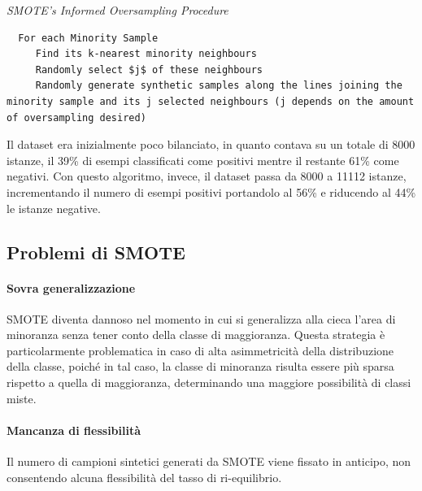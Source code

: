 \lstset{style=customAlg}
\begin{algorithm}
	\caption{\emph{SMOTE’s Informed Oversampling Procedure}}
	\begin{lstlisting}
  For each Minority Sample
     Find its k-nearest minority neighbours
     Randomly select $j$ of these neighbours
     Randomly generate synthetic samples along the lines joining the minority sample and its j selected neighbours (j depends on the amount of oversampling desired) 
	\end{lstlisting}
\end{algorithm}

Il dataset era inizialmente poco bilanciato, in quanto contava su un totale di 8000 istanze, il 39\% di esempi classificati come positivi mentre il restante 61\% come negativi. Con questo algoritmo, invece, il dataset passa da 8000 a 11112 istanze, incrementando il numero di esempi positivi portandolo al 56\% e riducendo al 44\% le istanze negative.
\subsection{Problemi di SMOTE}
\paragraph{Sovra generalizzazione}
SMOTE diventa dannoso nel momento in cui si generalizza alla cieca l'area di minoranza senza tener conto della classe di maggioranza. Questa strategia è particolarmente problematica in caso di alta asimmetricità della distribuzione della classe, poiché in tal caso, la classe di minoranza risulta essere più sparsa rispetto a quella di maggioranza, determinando una maggiore possibilità di classi miste.

\paragraph{Mancanza di flessibilità}
Il numero di campioni sintetici generati da SMOTE viene fissato in anticipo, non consentendo alcuna flessibilità del tasso di ri-equilibrio.

